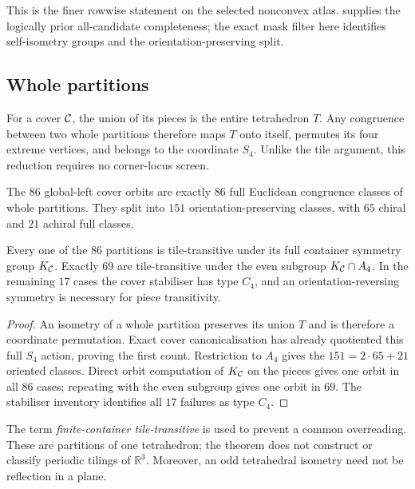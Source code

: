 This is the finer rowwise statement on the selected nonconvex atlas.
 supplies the logically prior all-candidate
completeness; the exact mask filter here identifies self-isometry groups and
the orientation-preserving split.

\subsection{Whole partitions}

For a cover $\mathcal C$, the union of its pieces is the entire tetrahedron $T$.
Any congruence between two whole partitions therefore maps $T$ onto itself,
permutes its four extreme vertices, and belongs to the coordinate $S_4$.
Unlike the tile argument, this reduction requires no corner-locus screen.

\begin{theorem}
\label{thm:partition-congruence}
The $86$ global-left cover orbits are exactly $86$ full Euclidean congruence
classes of whole partitions.  They split into $151$ orientation-preserving
classes, with $65$ chiral and $21$ achiral full classes.

Every one of the $86$ partitions is tile-transitive under its full container
symmetry group $K_\mathcal C$.  Exactly $69$ are tile-transitive under the even
subgroup $K_\mathcal C\cap A_4$.  In the remaining $17$ cases the cover stabiliser
has type $C_4$, and an orientation-reversing symmetry is necessary for piece
transitivity.
\end{theorem}
\begin{proof}
An isometry of a whole partition preserves its union $T$ and is therefore a
coordinate permutation.  Exact cover canonicalisation has already quotiented
this full $S_4$ action, proving the first count.  Restriction to $A_4$ gives
the $151=2\cdot65+21$ oriented classes.  Direct orbit computation of $K_\mathcal C$
on the pieces gives one orbit in all $86$ cases; repeating with the even
subgroup gives one orbit in $69$.  The stabiliser inventory identifies all
$17$ failures as type $C_4$.
\end{proof}

The term \emph{finite-container tile-transitive} is used to prevent a common
overreading.  These are partitions of one tetrahedron; the theorem does not
construct or classify periodic tilings of $\mathbb R^3$.  Moreover, an odd
tetrahedral isometry need not be reflection in a plane.

